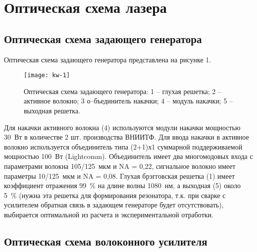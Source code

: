 \section{Оптическая схема лазера}
\label{sec:kw-scheme}

\subsection{Оптическая схема задающего генератора}

Оптическая схема задающего генератора представлена на рисунке 1.
\begin{figure}
  \centering
  \texttt{[image: kw-1]}
  \caption{Оптическая схема задающего генератора: 1 – глухая решетка; 2 – активное волокно; 3 о–бъединитель накачки; 4 – модуль накачки; 5 – выходная решетка.}
  \label{img:kw-1}
\end{figure}

Для накачки активного волокна (4) используются модули накачки мощностью 30~Вт в количестве 2 шт. производства ВНИИТФ. Для ввода накачки в активное волокно используется объединитель типа (2+1)х1 суммарной поддерживаемой мощностью 100~Вт (Lightcomm). Объединитель имеет два многомодовых входа с параметрами волокна 105/125~мкм и NA = 0,22, сигнальное волокно имеет параметры 10/125~мкм и NA = 0,08. Глухая брэгговская решетка (1) имеет коэффициент отражения 99~\% на длине волны 1080~нм, а выходная (5) около 5~\% (нужна эта решетка для формирования резонатора, т.к. при сварке с усилителем обратная связь в задающем генераторе будет отсутствовать), выбирается оптимальной из расчета и экспериментальной отработки.

\subsection{Оптическая схема волоконного усилителя}

